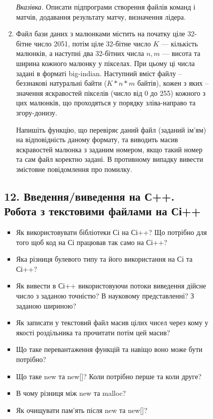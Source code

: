 \documentclass[]{article}
\makeatletter
\newcommand{\xslalph}[1]{\expandafter\@xslalph\csname c@#1\endcsname}
\newcommand{\@xslalph}[1]{%
    \ifcase#1\or а\or б\or в\or г\or д\or e\or є\or ж\or з\or i%
    \or й\or к\or л\or м\or н\or о\or п\or р\or с\or т%
    \or у\or ф\or х\or ц\or ч\or ш\or ю\or я\or аа\or бб\or вв%
    \else\@ctrerr\fi%
}
\makeatother
\begin{document}
\begin{enumerate}
\begin{enumerate}[label=\xslalph*)]
\begin{enumerate}
\begin{enumerate}[label=\xslalph*)]
\begin{enumerate}
\emph{Вказівка.} Описати підпрограми створення файлів команд і матчів, 
додавання результату матчу, визначення лідера.

\item
Файл бази даних з малюнками містить на початку ціле 32-бітне число
2051, потім ціле 32-бітне число $K$ --- кількість малюнків, а наступні два
32-бітних числа $n,m$ --- висота та ширина кожного малюнку у
пікселах. При цьому ці числа задані в форматі big-indian.
Наступний вміст файлу -- беззнакові натуральні байти ($K*n*m$ байтів),
кожен з яких -- значення яскравостей пікселів (число від 0 до 255)
кожного з цих малюнків, що проходяться у порядку зліва-направо та
згору-донизу.

Напишіть функцію, що перевіряє даний файл (заданий ім'ям) на
відповідність даному формату, та виводить масив яскравостей малюнка з
заданим номером, якщо такий номер та сам файл коректно задані. В
противному випадку вивести змістовне повідомлення про помилку.

\end{enumerate}


\newpage
\subsection{12. Введення/виведення на С++. Робота з текстовими файлами на Сі++}
\setcounter{subsection}{1}


\begin{itemize}

\item
  Як використовувати бібліотеки Сі на Сі++? Що потрібно для того щоб код
  на Сі працював так само на Сі++?
\item
  Яка різниця булевого типу та його використання на Сі та Сі++?
\item
  Як вивести в Сі++ використовуючи потоки виведення дійсне число з
  заданою точністю? В науковому представленні? З заданою шириною?
\item
  Як записати у текстовий файл масив цілих чисел через кому у якості
  роздільника та прочитати потім цей масив?
\item
  Що таке перевантаження функцій та навіщо воно може бути потрібно?
\item
  Що таке new та new{[}{]}? Коли потрібно перше та коли друге?
\item
  В чому різниця між new та malloc?
\item
  Як очищувати пам'ять після new та new{[}{]}?
\end{itemize}


\end{enumerate}
\end{enumerate}
\end{enumerate}
\end{enumerate}
\end{document}
